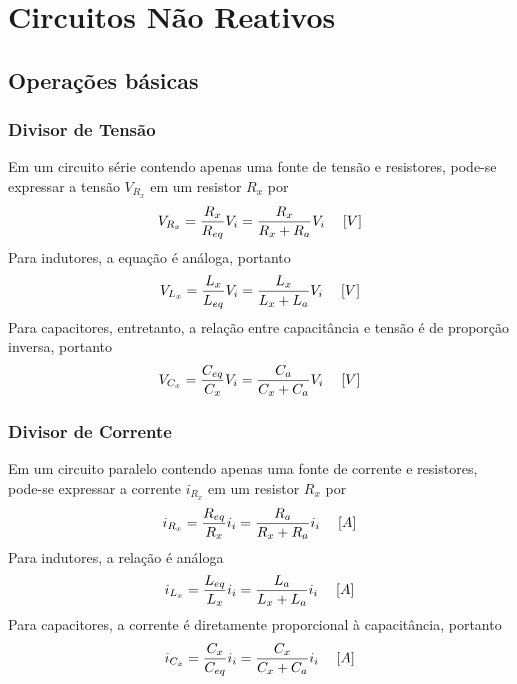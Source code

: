 \documentclass{article}
\numberwithin{equation}{section}
\begin{document}
    \section{Circuitos Não Reativos}
    \label{sec:resistivos}

    \subsection{Operações básicas}

    \subsubsection{Divisor de Tensão}
    \label{subsubsec:divten}
    Em um circuito série contendo apenas uma fonte de tensão e resistores, pode-se expressar a tensão $V_{R_x}$ em um resistor $R_{x}$ por
    \begin{equation}
        V_{R_x}=\frac{R_{x}}{R_{eq}}V_{i}=\frac{R_{x}}{R_{x}+R_{a}}V_{i} \hspace{0.45cm}[V]
    \end{equation}
    Para indutores, a equação é análoga, portanto
    \begin{equation}
        V_{L_x}=\frac{L_{x}}{L_{eq}}V_{i}=\frac{L_{x}}{L_{x}+L_{a}}V_{i} \hspace{0.45cm}[V]
    \end{equation}
    Para capacitores, entretanto, a relação entre capacitância e tensão é de proporção inversa, portanto
    \begin{equation}
        V_{C_x}=\frac{C_{eq}}{C_{x}}V_{i}=\frac{C_{a}}{C_{x}+C_{a}}V_{i} \hspace{0.45cm}[V]
    \end{equation}

    \subsubsection{Divisor de Corrente}
    \label{subsubsec:divcor}
    Em um circuito paralelo contendo apenas uma fonte de corrente e resistores, pode-se expressar a corrente $i_{R_x}$ em um resistor $R_{x}$ por
    \begin{equation}
        i_{R_x}=\frac{R_{eq}}{R_{x}}i_{i}=\frac{R_{a}}{R_{x}+R_{a}}i_{i} \hspace{0.45cm}[A]
    \end{equation}
    Para indutores, a relação é análoga
    \begin{equation}
        i_{L_x}=\frac{L_{eq}}{L_{x}}i_{i}=\frac{L_{a}}{L_{x}+L_{a}}i_{i} \hspace{0.45cm}[A]
    \end{equation}
    Para capacitores, a corrente é diretamente proporcional à capacitância, portanto
    \begin{equation}
        i_{C_x}=\frac{C_{x}}{C_{eq}}i_{i}=\frac{C_{x}}{C_{x}+C_{a}}i_{i} \hspace{0.45cm}[A]
    \end{equation}
\end{document}
